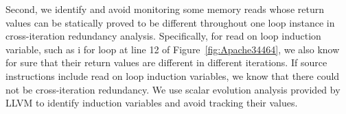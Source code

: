 

Second, we identify and avoid monitoring some memory reads whose return values 
can be statically proved to be different throughout one loop instance in 
cross-iteration redundancy analysis.
Specifically, for read on loop induction variable, such as i for loop at line 12 of Figure~\ref{fig:Apache34464}, 
we also know for sure that their return
values are different in different iterations. 
If source instructions include read on loop induction variables, we know that 
there could not be cross-iteration redundancy. 
We use scalar evolution analysis
provided by LLVM to identify induction variables and avoid tracking their
values.

%


 
